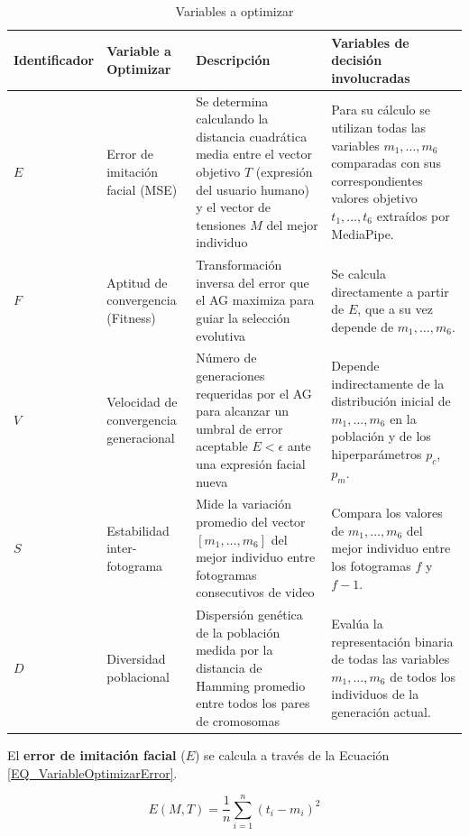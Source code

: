 \begin{table}[H]
    \centering
    \begin{tabularx}{\textwidth}{|l|l|X|X|}
        \hline
        \textbf{Identificador} & \textbf{Variable a Optimizar} & \textbf{Descripción} & \textbf{Variables de decisión involucradas} \\
        \hline
        $E$ & Error de imitación facial (MSE) & Se determina calculando la distancia cuadrática media entre el vector objetivo $T$ (expresión del usuario humano) y el vector de tensiones $M$ del mejor individuo & Para su cálculo se utilizan todas las variables $m_1, \dots, m_6$ comparadas con sus correspondientes valores objetivo $t_1, \dots, t_6$ extraídos por MediaPipe. \\
        \hline
        $F$ & Aptitud de convergencia (Fitness) & Transformación inversa del error que el AG maximiza para guiar la selección evolutiva & Se calcula directamente a partir de $E$, que a su vez depende de $m_1, \dots, m_6$. \\
        \hline
        $V$ & Velocidad de convergencia generacional & Número de generaciones requeridas por el AG para alcanzar un umbral de error aceptable $E < \epsilon$ ante una expresión facial nueva & Depende indirectamente de la distribución inicial de $m_1, \dots, m_6$ en la población y de los hiperparámetros $p_c$, $p_m$. \\
        \hline
        $S$ & Estabilidad inter-fotograma & Mide la variación promedio del vector $[m_1, \dots, m_6]$ del mejor individuo entre fotogramas consecutivos de video & Compara los valores de $m_1, \dots, m_6$ del mejor individuo entre los fotogramas $f$ y $f-1$. \\
        \hline
        $D$ & Diversidad poblacional & Dispersión genética de la población medida por la distancia de Hamming promedio entre todos los pares de cromosomas & Evalúa la representación binaria de todas las variables $m_1, \dots, m_6$ de todos los individuos de la generación actual. \\
        \hline
    \end{tabularx}
    \caption{Variables a optimizar}
    \label{TBL_VariablesOptimizar}
\end{table}

El \textbf{error de imitación facial} ($E$) se calcula a través de la Ecuación \ref{EQ_VariableOptimizarError}.

\begin{equation}
    E(M, T) = \frac{1}{n} \sum_{i=1}^{n} (t_i - m_i)^2
    \label{EQ_VariableOptimizarError}
\end{equation}

